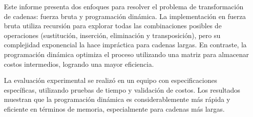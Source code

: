 Este informe presenta dos enfoques para resolver el problema de transformación de cadenas: fuerza bruta y programación dinámica. La implementación en fuerza bruta utiliza recursión para explorar todas las combinaciones posibles de operaciones (sustitución, inserción, eliminación y transposición), pero su complejidad exponencial la hace impráctica para cadenas largas. En contraste, la programación dinámica optimiza el proceso utilizando una matriz para almacenar costos intermedios, logrando una mayor eficiencia.

La evaluación experimental se realizó en un equipo con especificaciones específicas, utilizando pruebas de tiempo y validación de costos. Los resultados muestran que la programación dinámica es considerablemente más rápida y eficiente en términos de memoria, especialmente para cadenas más largas.